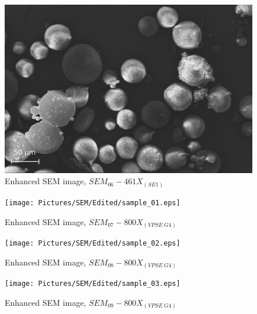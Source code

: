 \documentclass{article}
\begin{document}
                \begin{figure}[h!]
                    \centering 
                    \includegraphics[width=\textwidth]{Pictures/SEM/Edited/06_03.eps}
                    \caption{Enhanced SEM image, $SEM_{06}-461X_{(SE1)}$ \autocites{Pixelmator_Pro}{GIMP}}
                    \label{fig:SEM_06}
                \end{figure}
            
                \begin{figure}[h!]
                    \centering 
                    \texttt{[image: Pictures/SEM/Edited/sample\_01.eps]}
                    \caption{Enhanced SEM image, $SEM_{07}-800X_{(VPSE \ G4)}$ \autocites{Pixelmator_Pro}{GIMP}}
                    \label{fig:SEM_07}
                \end{figure}
            
                \begin{figure}[h!]
                    \centering 
                    \texttt{[image: Pictures/SEM/Edited/sample\_02.eps]}
                    \caption{Enhanced SEM image, $SEM_{08}-800X_{(VPSE \ G4)}$ \autocites{Pixelmator_Pro}{GIMP}}
                    \label{fig:SEM_08}
                \end{figure}
            
                \begin{figure}[h!]
                    \centering 
                    \texttt{[image: Pictures/SEM/Edited/sample\_03.eps]}
                    \caption{Enhanced SEM image, $SEM_{09}-800X_{(VPSE \ G4)}$ \autocites{Pixelmator_Pro}{GIMP}}
                    \label{fig:SEM_09}
                \end{figure}
\end{document}
